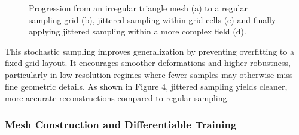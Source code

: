 \begin{figure}[ht]
\begin{adjustbox}{center}
  \end{adjustbox}
  \caption{Progression from an irregular triangle mesh (a) to a regular sampling grid (b), jittered sampling within grid cells (c) and finally applying jittered sampling within a more complex field (d).}
  \label{fig:progression_sampling}
\end{figure}

This stochastic sampling improves generalization by preventing overfitting to a fixed grid layout.
It encourages smoother deformations and higher robustness, particularly in low-resolution regimes where fewer samples may otherwise miss fine geometric details.
As shown in Figure 4, jittered sampling yields cleaner, more accurate reconstructions compared to regular sampling.





\subsubsection{Mesh Construction and Differentiable Training}

